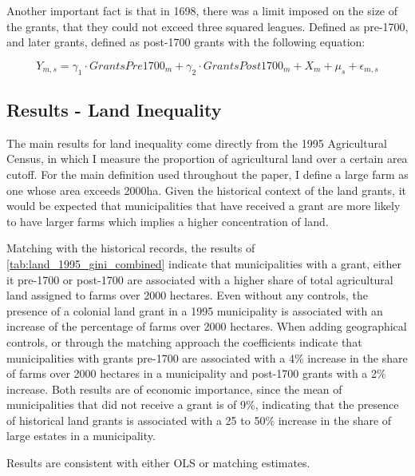 \documentclass{article}
\begin{document}
Another important fact is that in 1698, there was a limit imposed on the size of the grants, that they could not exceed three squared leagues. Defined as pre-1700, and later grants, defined as post-1700 grants with the following equation:

\begin{equation}
  \label{eqn:ols_matching}
  Y_{m,s} = \gamma_1 \cdot GrantsPre1700_m + \gamma_2 \cdot GrantsPost1700_m + X_{m} + \mu_s + \epsilon_{m,s}
\end{equation}




\subsection{Results - Land Inequality}

The main results for land inequality come directly from the 1995 Agricultural Census, in which I measure the proportion of agricultural land over a certain area cutoff. 
For the main definition used throughout the paper, I define a large farm as one whose area exceeds 2000ha. 
Given the historical context of the land grants, it would be expected that municipalities that have received a grant are more likely to have larger farms which implies a higher concentration of land. 

Matching with the historical records, the results of \autoref{tab:land_1995_gini_combined} indicate that municipalities with a grant, either it pre-1700 or post-1700 are associated with a higher share of total agricultural land assigned to farms over 2000 hectares. 
Even without any controls, the presence of a colonial land grant in a 1995 municipality is associated with an increase of the percentage of farms over 2000 hectares.
When adding geographical controls, or through the matching approach the coefficients indicate that municipalities with grants pre-1700 are associated with a 4\% increase in the share of farms over 2000 hectares in a municipality and post-1700 grants with a 2\% increase. 
Both results are of economic importance, since the mean of municipalities that did not receive a grant is of 9\%, indicating that the presence of historical land grants is associated with a 25 to 50\% increase in the share of large estates in a municipality. 

Results are consistent with either OLS or matching estimates. 
\end{document}
